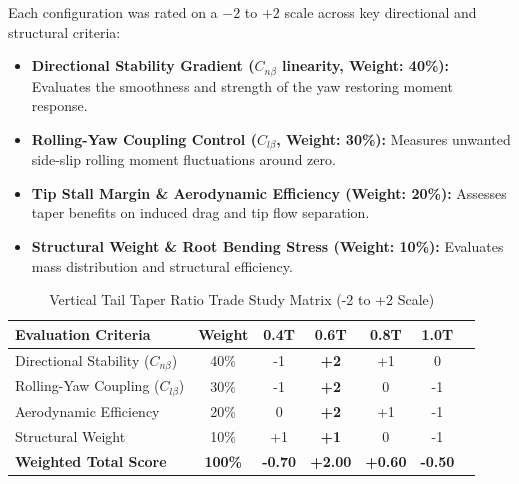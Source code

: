 \documentclass[11pt,a4paper]{article}
\begin{document}
Each configuration was rated on a $-2$ to $+2$ scale across key directional and structural criteria:
\begin{itemize}
    \item \textbf{Directional Stability Gradient ($C_{n\beta}$ linearity, Weight: 40\%):} Evaluates the smoothness and strength of the yaw restoring moment response.
    \item \textbf{Rolling-Yaw Coupling Control ($C_{l\beta}$, Weight: 30\%):} Measures unwanted side-slip rolling moment fluctuations around zero.
    \item \textbf{Tip Stall Margin \& Aerodynamic Efficiency (Weight: 20\%):} Assesses taper benefits on induced drag and tip flow separation.
    \item \textbf{Structural Weight \& Root Bending Stress (Weight: 10\%):} Evaluates mass distribution and structural efficiency.
\end{itemize}

\begin{table}[H]
\centering
\caption{Vertical Tail Taper Ratio Trade Study Matrix (-2 to +2 Scale)}
\begin{tabular}{lcccccc}
\toprule
\textbf{Evaluation Criteria} & \textbf{Weight} & \textbf{0.4T} & \textbf{0.6T} & \textbf{0.8T} & \textbf{1.0T} \\
\midrule
Directional Stability ($C_{n\beta}$) & 40\% & -1 & \textbf{+2} & +1 & 0 \\
Rolling-Yaw Coupling ($C_{l\beta}$) & 30\% & -1 & \textbf{+2} & 0 & -1 \\
Aerodynamic Efficiency & 20\% & 0 & \textbf{+2} & +1 & -1 \\
Structural Weight & 10\% & +1 & \textbf{+1} & 0 & -1 \\
\midrule
\textbf{Weighted Total Score} & \textbf{100\%} & \textbf{-0.70} & \textbf{+2.00} & \textbf{+0.60} & \textbf{-0.50} \\
\bottomrule
\end{tabular}
\end{table}
\end{document}
